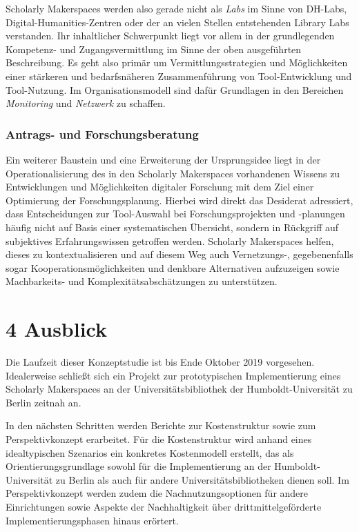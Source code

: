 \documentclass[a4paper,
fontsize=11pt,
oneside,
numbers=noperiodatend,
parskip=half-,
bibliography=totoc,
final
]{scrartcl}
\begin{document}
Scholarly Makerspaces werden also gerade nicht als \emph{Labs} im Sinne
von DH-Labs, Digital-Huma\-nities-Zentren oder der an vielen Stellen
entstehenden Library Labs verstanden. Ihr inhaltlicher Schwerpunkt liegt
vor allem in der grundlegenden Kompetenz- und Zugangsvermittlung im
Sinne der oben ausgeführten Beschreibung. Es geht also primär um
Vermittlungsstrategien und Möglichkeiten einer stärkeren und
bedarfsnäheren Zusammenführung von Tool-Entwicklung und Tool-Nutzung. Im
Organisationsmodell sind dafür Grundlagen in den Bereichen
\emph{Monitoring} und \emph{Netzwerk} zu schaffen.

\hypertarget{antrags--und-forschungsberatung}{%
\subsubsection{Antrags- und
Forschungsberatung}\label{antrags--und-forschungsberatung}}

Ein weiterer Baustein und eine Erweiterung der Ursprungsidee liegt in
der Operationalisierung des in den Scholarly Makerspaces vorhandenen
Wissens zu Entwicklungen und Möglichkeiten digitaler Forschung mit dem
Ziel einer Optimierung der Forschungsplanung. Hierbei wird direkt das
Desiderat adressiert, dass Entscheidungen zur Tool-Auswahl bei
Forschungsprojekten und -planungen häufig nicht auf Basis einer
systematischen Übersicht, sondern in Rückgriff auf subjektives
Erfahrungswissen getroffen werden. Scholarly Makerspaces helfen, dieses
zu kontextualisieren und auf diesem Weg auch Vernetzungs-,
gegebenenfalls sogar Kooperationsmöglichkeiten und denkbare Alternativen
aufzuzeigen sowie Machbarkeits- und Komplexitätsabschätzungen zu
unterstützen.

\hypertarget{ausblick}{%
\section{4 Ausblick}\label{ausblick}}

Die Laufzeit dieser Konzeptstudie ist bis Ende Oktober 2019 vorgesehen.
Idealerweise schließt sich ein Projekt zur prototypischen
Implementierung eines Scholarly Makerspaces an der
Universitätsbibliothek der Humboldt-Universität zu Berlin zeitnah an.

In den nächsten Schritten werden Berichte zur Kostenstruktur sowie zum
Perspektivkonzept erarbeitet. Für die Kostenstruktur wird anhand eines
idealtypischen Szenarios ein konkretes Kostenmodell erstellt, das als
Orientierungsgrundlage sowohl für die Implementierung an der
Humboldt-Universität zu Berlin als auch für andere
Universitätsbibliotheken dienen soll. Im Perspektivkonzept werden zudem
die Nachnutzungsoptionen für andere Einrichtungen sowie Aspekte der
Nachhaltigkeit über drittmittelgeförderte Implementierungsphasen hinaus
erörtert.
\end{document}
